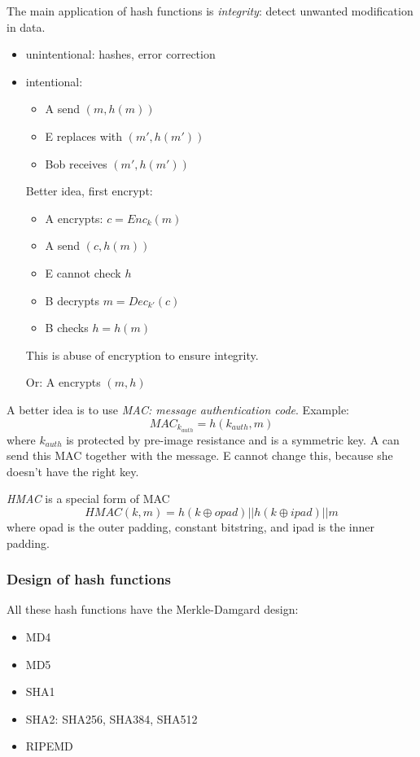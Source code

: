 \documentclass[language=english,number=]{homework}
\begin{document}
    The main application of hash functions is \textit{integrity}: detect unwanted modification in data.
    \begin{itemize}
        \item unintentional: hashes, error correction
        \item intentional:
        \begin{itemize}
            \item A send $(m,h(m))$
            \item E replaces with $(m', h(m'))$
            \item Bob receives $(m', h(m'))$
        \end{itemize}

        Better idea, first encrypt:
        \begin{itemize}
            \item A encrypts: $c = Enc_{k}(m)$
            \item A send $(c,h(m))$
            \item E cannot check $h$
            \item B decrypts $m = Dec_{k'}(c)$
            \item B checks $h = h(m)$
        \end{itemize}
        This is abuse of encryption to ensure integrity.

        Or: A encrypts $(m,h)$
    \end{itemize}

    A better idea is to use \textit{MAC: message authentication code}.
    Example:
    \[
        MAC_{k_{auth}} = h(k_{auth}, m)
    \]
    where $k_{auth}$ is protected by pre-image resistance and is a symmetric key.
    A can send this MAC together with the message.
    E cannot change this, because she doesn't have the right key.

    \textit{HMAC} is a special form of MAC
    \[
        HMAC(k,m) = h(k \oplus opad) || h(k \oplus ipad) || m
    \]
    where opad is the outer padding, constant bitstring, and ipad is the inner padding.

    \subsubsection{Design of hash functions}

    All these hash functions have the Merkle-Damgard design:
    \begin{itemize}
        \item MD4
        \item MD5
        \item SHA1
        \item SHA2: SHA256, SHA384, SHA512
        \item RIPEMD
    \end{itemize}
\end{document}
